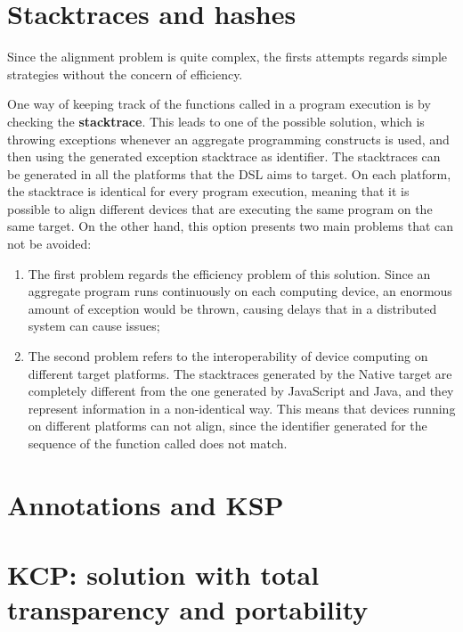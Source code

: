 \section{Stacktraces and hashes}\label{section:stacktraces_hashes}
Since the alignment problem is quite complex, the firsts attempts regards simple strategies without the concern of efficiency.

One way of keeping track of the functions called in a program execution is by checking the \textbf{stacktrace}. This leads to one of the possible solution, which is throwing exceptions whenever an aggregate programming constructs is used, and then using the generated exception stacktrace as identifier.\newline
The stacktraces can be generated in all the platforms that the DSL aims to target. On each platform, the stacktrace is identical for every program execution, meaning that it is possible to align different devices that are executing the same program on the same target.\newline
On the other hand, this option presents two main problems that can not be avoided:
\begin{enumerate}
    \item The first problem regards the efficiency problem of this solution. Since an aggregate program runs continuously on each computing device, an enormous amount of exception would be thrown, causing delays that in a distributed system can cause issues;
    \item The second problem refers to the interoperability of device computing on different target platforms. The stacktraces generated by the Native target are completely different from the one generated by JavaScript and Java, and they represent information in a non-identical way. This means that devices running on different platforms can not align, since the identifier generated for the sequence of the function called does not match.
\end{enumerate}

\section{Annotations and KSP}\label{section_annotation_ksp}
\section{KCP: solution with total transparency and portability}\label{section:compiler_plugin_solution}
